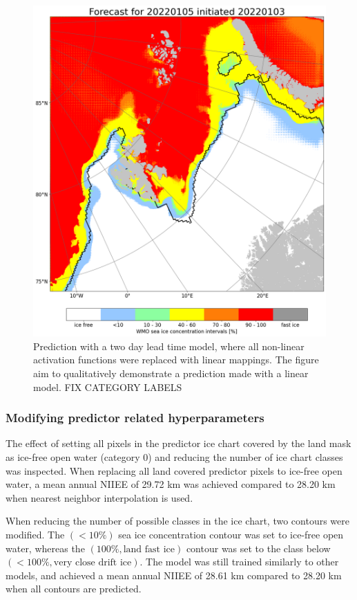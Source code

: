 \documentclass[../main/thesis]{subfiles}
\begin{document}
\begin{figure}
    \centering
    \includegraphics[width=\textwidth, trim=85mm 85mm 85mm 50mm, clip]{linear_model_jan}
    \caption{\label{fig:linear_model}Prediction with a two day lead time model, where all non-linear activation functions were replaced with linear mappings. The figure aim to qualitatively demonstrate a prediction made with a linear model. FIX CATEGORY LABELS}
\end{figure}

\subsubsection{Modifying predictor related hyperparameters}
\label{sec:modifyhyperparam}
The effect of setting all pixels in the predictor ice chart covered by the land mask as ice-free open water (category 0) and reducing the number of ice chart classes was inspected. When replacing all land covered predictor pixels to ice-free open water, a mean annual NIIEE of 29.72 km was achieved compared to 28.20 km when nearest neighbor interpolation is used. 

When reducing the number of possible classes in the ice chart, two contours were modified. The $(< 10\%)$ sea ice concentration contour was set to ice-free open water, whereas the $(100\%, \text{land fast ice})$ contour was set to the class below $(< 100\%, \text{very close drift ice})$. The model was still trained similarly to other models, and achieved a mean annual NIIEE of 28.61 km compared to 28.20 km when all contours are predicted.  
\end{document}
